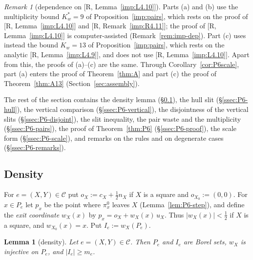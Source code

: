 \documentclass[11pt]{amsart}
\newtheorem{lemma}[theorem]{Lemma}
\theoremstyle{definition}
\theoremstyle{remark}
\newtheorem{remark}[theorem]{Remark}
\numberwithin{equation}{section}
\begin{document}
\begin{remark}[dependence on {[R, Lemma~\ref{imp:L4.10}]}]\label{rem:P6-dependency}
Parts (a) and (b) use the multiplicity bound $K_w^*=9$ of Proposition~\ref{imp:pairs}, which rests on the proof of
[R, Lemma~\ref{imp:L4.10}] and [R, Remark~\ref{imp:R4.11}]; the proof of [R, Lemma~\ref{imp:L4.10}] is
computer-assisted (Remark~\ref{rem:imp-dep}). Part (c) uses instead the bound $K_w=13$ of
Proposition~\ref{imp:pairs}, which rests on the analytic [R, Lemma~\ref{imp:L4.9}], and does not use
[R, Lemma~\ref{imp:L4.10}]. Apart from this, the proofs of (a)--(c) are the same. Through
Corollary~\ref{cor:P6scale}, part (a) enters the proof of Theorem~\ref{thm:A} and part (c) the proof of
Theorem~\ref{thm:A13} (Section~\ref{sec:assembly}).
\end{remark}

The rest of the section contains the density lemma (\S\ref{ssec:P6-density}), the hull slit (\S\ref{ssec:P6-hull}),
the vertical comparison (\S\ref{ssec:P6-vertical}), the disjointness of the vertical slits (\S\ref{ssec:P6-disjoint}),
the slit inequality, the pair waste and the multiplicity (\S\ref{ssec:P6-pairs}), the proof of Theorem~\ref{thm:P6}
(\S\ref{ssec:P6-proof}), the scale form (\S\ref{ssec:P6-scale}), and remarks on the rules and on degenerate cases
(\S\ref{ssec:P6-remarks}).

\subsection{Density}\label{ssec:P6-density}

For $e=(X,Y)\in\mathcal C$ put $o_X:=c_X+\frac12n_X$ if $X$ is a square and $o_{X_0}:=(0,0)$. For $x\in P_e$ let
$p_x$ be the point where $\pi^0_x$ leaves $X$ (Lemma~\ref{lem:P6-step}), and define the \emph{exit coordinate}
$w_X(x)$ by $p_x=o_X+w_X(x)\,u_X$. Thus $|w_X(x)|<\frac12$ if $X$ is a square, and $w_{X_0}(x)=x$. Put
$I_e:=w_X(P_e)$.

\begin{lemma}[density]\label{lem:P6-density}
Let $e=(X,Y)\in\mathcal C$. Then $P_e$ and $I_e$ are Borel sets, $w_X$ is injective on $P_e$, and $|I_e|\ge m_e$.
\end{lemma}
\end{document}
